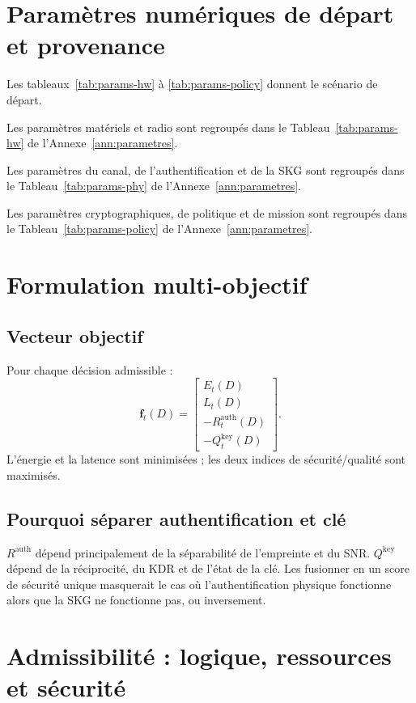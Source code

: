 \documentclass[conference,a4paper]{IEEEtran}
\newcommand{\Rauth}{R^{\mathrm{auth}}}
\newcommand{\Rkey}{Q^{\mathrm{key}}}
\begin{document}
\section{Paramètres numériques de départ et provenance}

Les tableaux~\ref{tab:params-hw} à \ref{tab:params-policy} donnent le scénario de départ.

Les paramètres matériels et radio sont regroupés dans le Tableau~\ref{tab:params-hw} de l'Annexe~\ref{ann:parametres}.

Les paramètres du canal, de l'authentification et de la SKG sont regroupés dans le Tableau~\ref{tab:params-phy} de l'Annexe~\ref{ann:parametres}.

Les paramètres cryptographiques, de politique et de mission sont regroupés dans le Tableau~\ref{tab:params-policy} de l'Annexe~\ref{ann:parametres}.


\section{Formulation multi-objectif}

\subsection{Vecteur objectif}
Pour chaque décision admissible :
\begin{equation}
\mathbf{f}_t(D)=
\begin{bmatrix}
E_t(D)\\
L_t(D)\\
-\Rauth_t(D)\\
-\Rkey_t(D)
\end{bmatrix}.
\label{eq:objective-vector}
\end{equation}
L'énergie et la latence sont minimisées ; les deux indices de sécurité/qualité sont maximisés.

\subsection{Pourquoi séparer authentification et clé}
$\Rauth$ dépend principalement de la séparabilité de l'empreinte et du SNR. $\Rkey$ dépend de la réciprocité, du KDR et de l'état de la clé. Les fusionner en un score de sécurité unique masquerait le cas où l'authentification physique fonctionne alors que la SKG ne fonctionne pas, ou inversement.

\section{Admissibilité : logique, ressources et sécurité}
\end{document}
